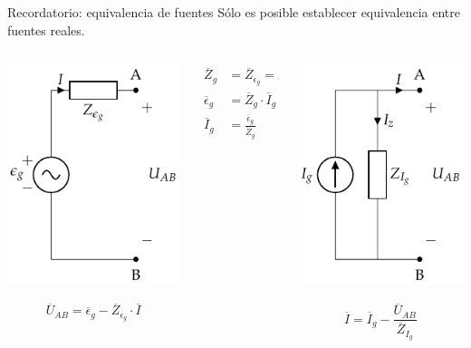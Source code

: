 \documentclass[aspectratio=169, usenames,svgnames,dvipsnames]{beamer}
\begin{document}
\begin{frame}[label={sec:org09ab5e9}]{Recordatorio: equivalencia de fuentes}
Sólo es posible establecer equivalencia entre \alert{fuentes reales}.
\begin{columns}
\begin{column}{0.33\columnwidth}
\begin{center}
\includegraphics[height=0.5\textheight]{../figs/FuenteTensionReal.pdf}
\end{center}
\[
  \overline{U}_{AB} = \overline{\epsilon}_g - \overline{Z}_{\epsilon_g} \cdot \overline{I}
\]
\end{column}
\begin{column}{0.33\columnwidth}
\begin{align*}
  \overline{Z}_g &= \overline{Z}_{\epsilon_g} = \overline{Z}_{I_g}\\
  \overline{\epsilon}_g &= \overline{Z}_g \cdot \overline{I}_g\\
  \overline{I}_g &= \frac{\overline{\epsilon}_g}{\overline{Z}_g}
\end{align*}
\end{column}
\begin{column}{0.33\columnwidth}
\begin{center}
\includegraphics[height=0.5\textheight]{../figs/FuenteCorrienteReal.pdf}
\end{center}
\[
  \overline{I} = \overline{I}_g - \frac{\overline{U}_{AB}}{\overline{Z}_{I_g}}
\]
\end{column}
\end{columns}
\end{frame}
\end{document}
